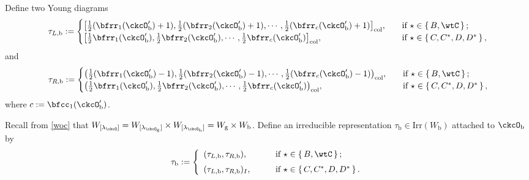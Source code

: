 \documentclass[12pt,a4paper]{amsart}
\numberwithin{equation}{section}
\theoremstyle{remark}
\def\half{{\tfrac{1}{2}}}
\def\Irr{\mathrm{Irr}}
\def\lamck{\lambda_\ckcO}
\def\lamckb{\lambda_{\ckcO_{\mathrm b}}}
\def\lamckg{\lambda_{\ckcO_{\mathrm g}}}
\def\Wb{W_{\mathrm b}}
\def\Wg{W_{\mathrm g}}
\begin{document}
Define two Young diagrams
 \begin{equation}\label{eq:taub}
    \begin{split}
      \tau_{L,\mathrm b} := \begin{cases}
        \big[\half(\bfrr_{1}(\ckcO'_{\mathrm b})+1), \half(\bfrr_{2}(\ckcO'_{\mathrm b})+1), \cdots, \half(\bfrr_{c}(\ckcO'_{\mathrm b})+1)\big]_{\mathrm{col}},
               &\quad \text{if } \star \in \set{B,\wtC}; \\%
         \big[\half\bfrr_{1}(\ckcO'_{\mathrm b}), \half\bfrr_{2}(\ckcO'_{\mathrm b}),\cdots, \half\bfrr_{c}(\ckcO'_{\mathrm b})\big]_{\mathrm{col}},
        &\quad  \text{if } \star \in \set{C,C^{*}, D,D^{*}},\\
      \end{cases}
    \end{split}
  \end{equation}
  and
   \begin{equation}\label{eq:taub2}
    \begin{split}
      \tau_{R,\mathrm b} := \begin{cases}
        \big(\half(\bfrr_{1}(\ckcO'_{\mathrm b})-1), \half(\bfrr_{2}(\ckcO'_{\mathrm b})-1), \cdots, \half(\bfrr_{c}(\ckcO'_{\mathrm b})-1)\big)_{\mathrm{col}},
               &\quad \text{if } \star \in \set{B,\wtC}; \\%
         \big(\half\bfrr_{1}(\ckcO'_{\mathrm b}), \half\bfrr_{2}(\ckcO'_{\mathrm b}),\cdots, \half\bfrr_{c}(\ckcO'_{\mathrm b})\big)_{\mathrm{col}},
        &\quad  \text{if } \star \in \set{C,C^{*}, D,D^{*}},\\
      \end{cases}
    \end{split}
  \end{equation}
 where $c:= \bfcc_{1}(\ckcO'_{\mathrm b})$.

 Recall  from \eqref{woc} that  $
    W_{[\lamck]} =W_{[\lamckg]}\times W_{[\lamckb]}=\Wg\times \Wb$.
 Define an irreducible  representation $\tau_{\mathrm b}\in \Irr(W_{\mathrm b})$ attached to $\ckcO_{\mathrm b}$ by
\begin{equation}\label{eq:taub}
 \tau_{\mathrm b}:= \left\{
     \begin{array}{ll}
       ( \tau_{L,\mathrm b}, \tau_{R,\mathrm b}), \qquad
       & \text{if } \star \in \set{B,\wtC}; \medskip\\
         ( \tau_{L,\mathrm b}, \tau_{R,\mathrm b})_I, \qquad & \text{if } \star \in \set{C,C^{*}, D,D^{*}}.
\end{array}
  \right.
\end{equation}
\end{document}

